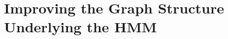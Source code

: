\documentclass[\relativeRoot/main.tex]{subfiles}
\begin{document}
\chapter{Improving the Graph Structure Underlying the HMM}
\label{chap:graph}




\end{document}
